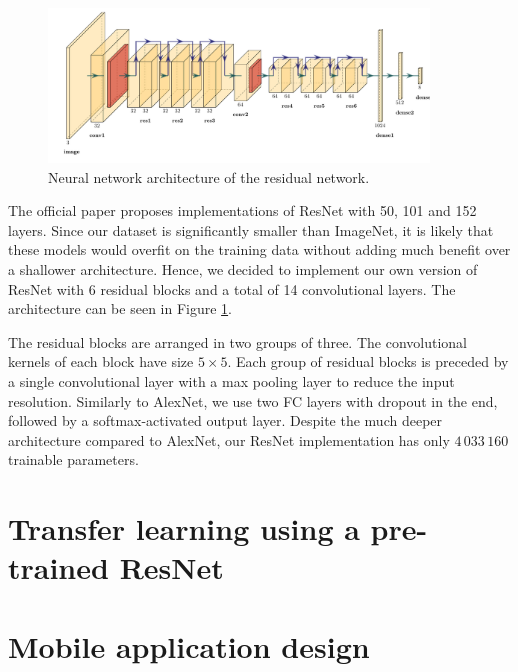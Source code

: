 \documentclass{l4proj}
\begin{document}
\begin{figure}[ht]
  \centering
  \includegraphics[width=0.9\textwidth]{images/models/resnet}
  \caption{Neural network architecture of the residual network.}
  \label{fig:resnet}
\end{figure}

The official paper proposes implementations of ResNet with 50, 101 and 152 layers. Since our dataset is significantly smaller than ImageNet, it is likely that these models would overfit on the training data without adding much benefit over a shallower architecture. Hence, we decided to implement our own version of ResNet with 6 residual blocks and a total of 14 convolutional layers. The architecture can be seen in Figure \ref{fig:resnet}.

The residual blocks are arranged in two groups of three. The convolutional kernels of each block have size $5 \times 5$. Each group of residual blocks is preceded by a single convolutional layer with a max pooling layer to reduce the input resolution. Similarly to AlexNet, we use two FC layers with dropout in the end, followed by a softmax-activated output layer. Despite the much deeper architecture compared to AlexNet, our ResNet implementation has only $4\,033\,160$ trainable parameters.



\section{Transfer learning using a pre-trained ResNet}




\section{Mobile application design}
\end{document}
